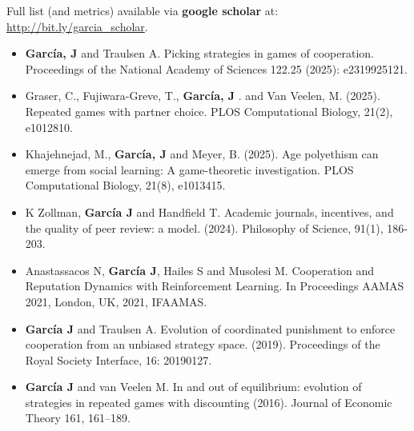 \documentclass[11pt,a4paper,sans]{moderncv}        %
\begin{document}
\noindent Full list (and metrics) available via \textbf{google scholar} at: \url{http://bit.ly/garcia_scholar}.
\vspace{0.3cm}

\begin{itemize}

    \item \textbf{Garc\'ia, J}  and Traulsen A. Picking strategies in games of cooperation. Proceedings of the National Academy of Sciences 122.25 (2025): e2319925121.
    
    \item Graser, C., Fujiwara-Greve, T., \textbf{Garc\'ia, J} . and Van Veelen, M. (2025). Repeated games with partner choice. PLOS Computational Biology, 21(2), e1012810.
    
    \item  Khajehnejad, M., \textbf{Garc\'ia, J} and Meyer, B. (2025). Age polyethism can emerge from social learning: A game-theoretic investigation. PLOS Computational Biology, 21(8), e1013415.

    \item K Zollman, \textbf{Garc\'ia J} and Handfield T. Academic journals, incentives, and the quality of peer review: a model. (2024). Philosophy of Science, 91(1), 186-203.

    \item Anastassacos N, \textbf{Garc\'ia J}, Hailes S and Musolesi M. Cooperation and Reputation Dynamics with Reinforcement Learning. In Proceedings AAMAS 2021, London, UK, 2021, IFAAMAS. 
	
    \item \textbf{Garc\'ia J} and Traulsen A. Evolution of coordinated punishment to enforce cooperation from an unbiased strategy space. (2019). Proceedings of the Royal Society Interface, 16: 20190127.

    

    \item \textbf{Garc\'ia J} and van Veelen M. In and out of equilibrium: evolution of strategies in repeated games with discounting (2016). Journal of Economic Theory 161, 161--189.



\end{itemize}
\end{document}
